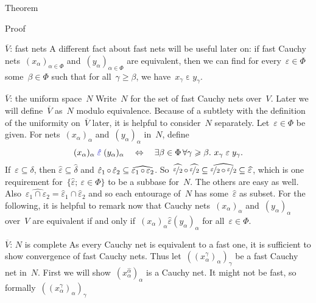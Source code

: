 \documentclass[b]{subfiles}
\begin{document}
\begin{parsec}
\begin{point}{Theorem}
\begin{point}{Proof}
\begin{point}{$\overline{V}$: fast nets}
A different fact about fast nets will be useful later on:
if fast Cauchy nets~$(x_\alpha)_{\alpha \in \Phi}$
    and~$(y_\alpha)_{\alpha \in \Phi}$ are equivalent,
    then we can find for every~$\varepsilon \in \Phi$
    some~$\beta \in \Phi$
    such that for all~$\gamma \geq \beta$,
    we have~$x_\gamma \mathrel{\varepsilon} y_\gamma$.
\end{point}
\begin{point}{$\overline{V}$: the uniform space~$N$}%
Write~$N$ for the set of fast Cauchy nets over~$V$.
Later we will define~$\overline{V}$ as~$N$ modulo equivalence.
Because of a subtlety with the definition of the uniformity
    on~$\overline{V}$ later,
    it is helpful to consider~$N$ separately.
Let~$\varepsilon \in \Phi$ be given.
For nets~$(x_\alpha)_{\alpha}$
    and~$(y_\alpha)_{\alpha}$ in~$N$,
    define
    \begin{equation*}
        (x_\alpha)_\alpha \mathrel{\Define{\hat\varepsilon}}
            (y_\alpha)_\alpha
            \quad\Leftrightarrow\quad
        \exists \beta \in \Phi \, \forall \gamma \geq \beta. \ 
        x_\gamma \mathrel{\varepsilon} y_\gamma.
    \end{equation*}
If~$\varepsilon \subseteq \delta$,
then $\hat\varepsilon \subseteq \hat\delta$
and
$\hat\varepsilon_1 \mathop{\circ} \hat\varepsilon_2 
\subseteq\widehat{\varepsilon_1 \mathop{\circ} \varepsilon_2}$.
So~$
\widehat{\nicefrac{\varepsilon}{2}} \mathop{\circ}
\widehat{\nicefrac{\varepsilon}{2}} \subseteq
\widehat{\nicefrac{\varepsilon}{2} \mathop{\circ}
\nicefrac{\varepsilon}{2}} \subseteq \widehat{\varepsilon}$,
which is one requirement for~$\{ \hat\varepsilon; \ \varepsilon \in \Phi\}$
to be a subbase for~$N$.
The others are easy as well. 
Also~$\widehat{\varepsilon_1 \cap \varepsilon_2} = \hat{\varepsilon}_1
    \cap \hat{\varepsilon}_2$
    and so each entourage of~$N$ has some~$\hat\varepsilon$ as subset.
For the following,
    it is helpful to remark now
    that Cauchy nets~$(x_\alpha)_\alpha$ and~$(y_\alpha)_\alpha$ over~$V$
    are equivalent if and only if~$(x_\alpha)_\alpha \mathrel{\hat\varepsilon}
    (y_\alpha)_\alpha$ for all~$\varepsilon \in \Phi$.
\end{point}
\begin{point}{$\overline{V}$: $N$ is complete}%
As every Cauchy net is equivalent to a fast one,
it is sufficient to show convergence of fast Cauchy nets.
Thus let~$((x^\gamma_\alpha)_\alpha)_\gamma$
    be a fast Cauchy net in~$N$.
First we will show~$(x^{\hat\alpha}_\alpha)_\alpha$
    is a Cauchy net.
It might not be fast, so
    formally~$((x^\gamma_\alpha)_\alpha)_\gamma$

\end{point}
\end{point}
\end{point}
\end{parsec}
\end{document}

